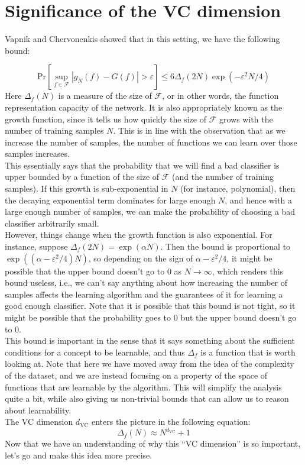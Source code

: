 \documentclass[11pt]{article}
\newcommand{\nl}{\vspace*{0.3cm}\\}
\begin{document}
\section{Significance of the VC dimension}

Vapnik and Chervonenkis showed that in this setting, we have the following bound:

\[
\mathrm{Pr}[\sup_{f \in \mathcal{F}}|g_N(f) - G(f)| > \varepsilon] \le 6 \Delta_f(2N) \exp(-\varepsilon^2 N / 4)
\]
Here $\Delta_f(N)$ is a measure of the size of $\mathcal{F}$, or in other words, the function representation capacity of the network. It is also appropriately known as the growth function, since
it tells us how quickly the size of $\mathcal{F}$ grows with the number of training samples $N$. This is in line with the observation that as we increase the number of samples, the number of
functions we can learn over those samples increases.\nl
This essentially says that the probability that we will find a bad classifier is upper bounded by a function of the size of $\mathcal{F}$ (and the number of training samples). If this growth is
sub-exponential in $N$ (for instance, polynomial), then the decaying exponential term dominates for large enough $N$, and hence with a large enough number of samples, we can make the probability of choosing a bad classifier arbitrarily
small.\nl
However, things change when the growth function is also exponential. For instance, suppose $\Delta_f(2N) = \exp(\alpha N)$. Then the bound is proportional to $\exp((\alpha -
\varepsilon^2/4) N)$, so depending on the sign of $\alpha - \varepsilon^2 / 4$, it might be possible that the upper bound doesn't go to $0$ as $N \to \infty$, which renders this bound useless,
i.e., we can't say anything about how increasing the number of samples affects the learning algorithm and the guarantees of it for learning a good enough classifier.
Note that it is possible that this bound is not tight, so it might be possible that the probability goes to $0$ but the upper bound doesn't go to $0$.\nl
This bound is important in the sense that it says something about the sufficient conditions for a concept to be learnable, and thus $\Delta_f$ is a function that is worth looking at. Note that
here we have moved away from the idea of the complexity of the dataset, and we are instead focusing on a property of the space of functions that are learnable by the algorithm. This will simplify the
analysis quite a bit, while also giving us non-trivial bounds that can allow us to reason about learnability.\nl
The VC dimension $d_{\text{VC}}$ enters the picture in the following equation:
\[
    \Delta_f(N) \approx N^{d_{\text{VC}}} + 1
\]
Now that we have an understanding of why this ``VC dimension'' is so important, let's go and make this idea more precise.
\newpage
\end{document}
